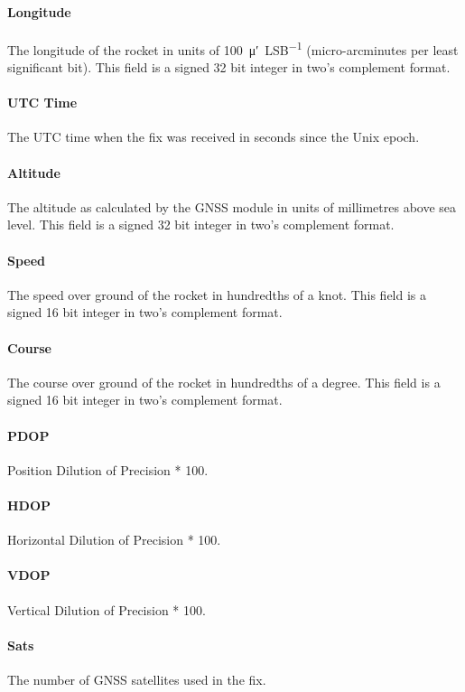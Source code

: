 \paragraph{Longitude}
The longitude of the rocket in units of \SI{100}{\micro\arcminute\per LSB}
(micro-arcminutes per least significant bit). This field is a signed 32 bit
integer in two's complement format.

\paragraph{UTC Time}
The UTC time when the fix was received in seconds since the Unix epoch.

\paragraph{Altitude}
The altitude as calculated by the GNSS module in units of millimetres above
sea level. This field is a signed 32 bit integer in two's complement format.

\paragraph{Speed}
The speed over ground of the rocket in hundredths of a knot. This field is a
signed 16 bit integer in two's complement format.

\paragraph{Course}
The course over ground of the rocket in hundredths of a degree. This field is a
signed 16 bit integer in two's complement format.

\paragraph{PDOP}
Position Dilution of Precision * 100.

\paragraph{HDOP}
Horizontal Dilution of Precision * 100.

\paragraph{VDOP}
Vertical Dilution of Precision * 100.

\paragraph{Sats}
The number of GNSS satellites used in the fix.

